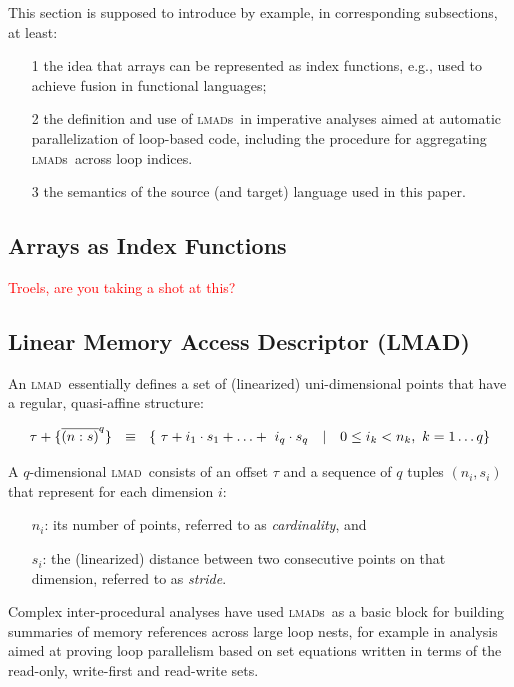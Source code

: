 \documentclass[conference]{IEEEtran}
\newcommand\ToDo[1]{\textcolor{red}{#1}}
\newcommand\lmad{\textsc{lmad~}}
\newcommand\lmads{\textsc{lmad}s~}
\begin{document}
This section is supposed to introduce by example,
in corresponding subsections, at least:
\begin{itemize}
\item[1] the idea that arrays can be represented as
         index functions, e.g., used to achieve fusion
         in functional languages;
\item[2] the definition and use of \lmads in imperative
         analyses aimed at automatic parallelization
         of loop-based code, including the procedure
         for aggregating \lmads across loop indices.
\item[3] the semantics of the source (and target)
         language used in this paper.
\end{itemize}

\subsection{Arrays as Index Functions}
\label{subsec:ixfun-intro}

\ToDo{Troels, are you taking a shot at this?}

\subsection{Linear Memory Access Descriptor (LMAD)}
\label{subsec:lmad-intro}


An \lmad essentially defines a set of (linearized)
uni-dimensional points that have a regular, quasi-affine structure:
%
\begin{scriptsize}
\begin{equation}
\tau + \{\ov{(n:s)}^q\} \ \ \equiv \ \ \{ \ \tau + i_1 \cdot s_1  + \ldots + \ i_{q}\cdot s_{q} \ \ \ | \ \ \ 0 \leq i_k < n_k, \ k = 1\ldots q\}\label{def-lmad}
\end{equation}
\end{scriptsize}
%
A $q$-dimensional \lmad consists of an offset $\tau$ and a
sequence of $q$ tuples $(n_i,s_i)$ that represent for each dimension $i$:
\begin{itemize}
\item[$n_i$:] its number of points, referred to as {\em cardinality}, and
\item[$s_i$:] the (linearized) distance between two consecutive points
              on that dimension, referred to as {\em stride}.
\end{itemize}

Complex inter-procedural analyses have used \lmads as a basic block
for building summaries of memory references across large loop nests,
for example in analysis aimed at proving loop parallelism based on
set equations written in terms of the read-only, write-first and
read-write sets.
\end{document}

